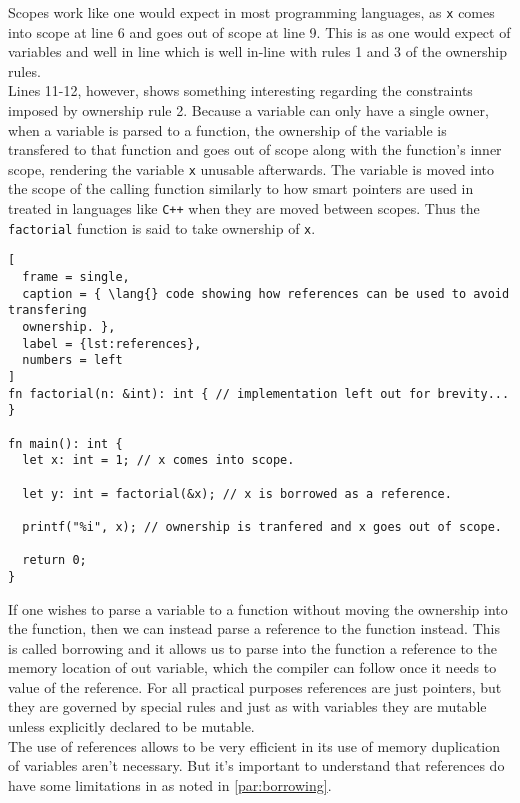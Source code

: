 Scopes work like one would expect in most programming languages, as \texttt{x} comes into
scope at line 6 and goes out of scope at line 9. This is as one would expect of
variables and well in line which is well in-line with rules 1 and 3 of the ownership
rules. \\

Lines 11-12, however, shows something interesting regarding the constraints imposed
by ownership rule 2. Because a variable can only have a single owner, when a variable
is parsed to a function, the ownership of the variable is transfered to that function
and goes out of scope along with the function's inner scope, rendering the variable
\texttt{x} unusable afterwards. The variable is moved into the scope of the calling
function similarly to how smart pointers are used in treated in languages like
\texttt{C++} when they are moved between scopes\cite{CPPRef}. Thus the
\texttt{factorial} function is said to take ownership of \texttt{x}.

\begin{lstlisting}[
  frame = single,
  caption = { \lang{} code showing how references can be used to avoid transfering
  ownership. }, 
  label = {lst:references},
  numbers = left
]
fn factorial(n: &int): int { // implementation left out for brevity... }

fn main(): int {
  let x: int = 1; // x comes into scope.

  let y: int = factorial(&x); // x is borrowed as a reference.

  printf("%i", x); // ownership is tranfered and x goes out of scope.

  return 0;
}
\end{lstlisting}

If one wishes to parse a variable to a function without moving the ownership into the
function, then we can instead parse a reference to the function instead. This is
called borrowing and it allows us to parse into the function a reference to the
memory location of out variable, which the compiler can follow once it needs to value
of the reference. For all practical purposes references are just pointers, but they
are governed by special rules and just as with variables they are mutable unless
explicitly declared to be mutable. \\

The use of references allows \lang{} to be very efficient in its use of memory
duplication of variables aren't necessary. But it's important to understand that
references do have some limitations in \lang{} as noted in \ref{par:borrowing}. \\


